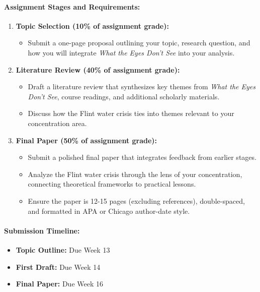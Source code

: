 \documentclass[11pt, letterpaper]{article}
\begin{document}
\paragraph*{Assignment Stages and Requirements:}
\begin{enumerate}
    \item \textbf{Topic Selection (10\% of assignment grade):}
    \begin{itemize}
        \item Submit a one-page proposal outlining your topic, research question, and how you will integrate \textit{What the Eyes Don’t See} into your analysis.
    \end{itemize}
    \item \textbf{Literature Review (40\% of assignment grade):}
    \begin{itemize}
        \item Draft a literature review that synthesizes key themes from \textit{What the Eyes Don’t See}, course readings, and additional scholarly materials.
        \item Discuss how the Flint water crisis ties into themes relevant to your concentration area.
    \end{itemize}
    \item \textbf{Final Paper (50\% of assignment grade):}
    \begin{itemize}
        \item Submit a polished final paper that integrates feedback from earlier stages.
        \item Analyze the Flint water crisis through the lens of your concentration, connecting theoretical frameworks to practical lessons.
        \item Ensure the paper is 12-15 pages (excluding references), double-spaced, and formatted in APA or Chicago author-date style.
    \end{itemize}
\end{enumerate}

\paragraph*{Submission Timeline:}
\begin{itemize}
    \item \textbf{Topic Outline:} Due Week 13
    \item \textbf{First Draft:} Due Week 14
    \item \textbf{Final Paper:} Due Week 16
\end{itemize}
\end{document}
